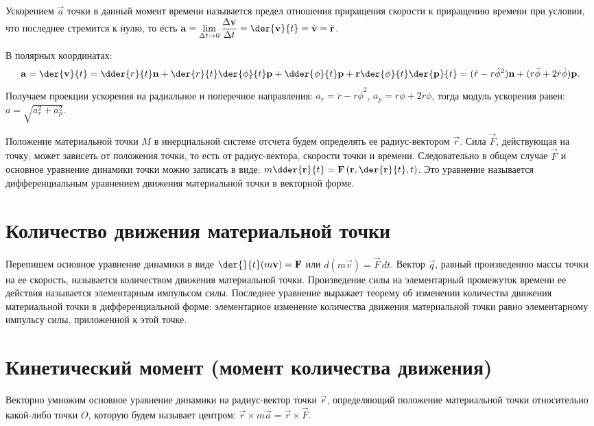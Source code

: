 Ускорением \( \vec{a} \) точки в данный момент времени называется предел
отношения приращения скорости к приращению времени при условии, что последнее
стремится к нулю, то есть \( \ds \vec{a} = \lim_{\D t\to 0} \Der{\vec{v}}{t} =
\der{\vec{v}}{t} = \dot{\vec{v}} = \ddot{\vec{r}} \).
 
В полярных координатах:
\[
    \vec{a} = \der{\vec{v}}{t} = \dder{r}{t}\vec{n} + \der{r}{t}\der{\phi}{t}
    \vec{p} + \dder{\phi}{t}\vec{p} + \vec{r}\der{\phi}{t}\der{\vec{p}}{t} =
    (\ddot{r}-r\dot{\phi}^2)\vec{n} + (r\ddot{\phi}+2\dot{r}\dot{\phi})\vec{p}.
\]
Получаем проекции ускорения на радиальное и поперечное направления:
\( a_r = \ddot{r}-r\dot{\phi}^2 \), \( a_p = r\ddot{\phi}+2\dot{r}\dot{\phi} \),
тогда модуль ускорения равен: \( a = \sqrt{a_r^2 + a_p^2} \).

Положение материальной точки \( M \) в инерциальной системе отсчета будем
определять ее радиус-вектором \( \vec{r} \). Сила \( \vec{F} \), действующая на
точку, может зависеть от положения точки, то есть от радиус-вектора, скорости
точки и времени. Следовательно в общем случае \( \vec{F} \) и основное уравнение
динамики точки можно записать в виде: \( \ds m\dder{\vec{r}}{t} =
\vec{F}\left(\vec{r}, \der{\vec{r}}{t}, t\right) \).
Это уравнение называется дифференциальным уравнением движения материальной точки
в векторной форме.

\section{Количество движения материальной точки}
Перепишем основное уравнение динамики в виде
\( \ds \der{}{t}(m\vec{v}) = \vec{F} \) или \( d(m\vec{v}) = \vec{F}\,dt \).
Вектор \( \vec{q} \), равный произведению массы точки на ее скорость, называется
количеством движения материальной точки. Произведение силы на элементарный
промежуток времени ее действия называется элементарным импульсом силы. Последнее
уравнение выражает теорему об изменении количества движения материальной точки в
дифференциальной форме: элементарное изменение количества движения материальной
точки равно элементарному импульсу силы, приложенной к этой точке.

\section{Кинетический момент (момент количества движения)}
Векторно умножим основное уравнение динамики на радиус-вектор точки
\( \vec{r} \), определяющий положение материальной точки относительно какой-либо
точки \( O \), которую будем называет центром:
\( \vec{r}\times m\vec{a} = \vec{r}\times\vec{F} \).

